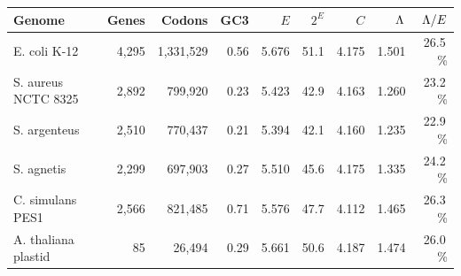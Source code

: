 \begin{tabular}{@{}l r r r r r r r r@{}}
\toprule
Genome & Genes & Codons & GC3 & $E$ & $2^{E}$ & $C$ & $\Lambda$ & $\Lambda/E$ \\
\midrule
E. coli K-12 & 4{,}295 & 1{,}331{,}529 & 0.56 & 5.676 & 51.1 & 4.175 & 1.501 & 26.5\,\% \\
S. aureus NCTC 8325 & 2{,}892 & 799{,}920 & 0.23 & 5.423 & 42.9 & 4.163 & 1.260 & 23.2\,\% \\
S. argenteus & 2{,}510 & 770{,}437 & 0.21 & 5.394 & 42.1 & 4.160 & 1.235 & 22.9\,\% \\
S. agnetis & 2{,}299 & 697{,}903 & 0.27 & 5.510 & 45.6 & 4.175 & 1.335 & 24.2\,\% \\
C. simulans PES1 & 2{,}566 & 821{,}485 & 0.71 & 5.576 & 47.7 & 4.112 & 1.465 & 26.3\,\% \\
A. thaliana plastid & 85 & 26{,}494 & 0.29 & 5.661 & 50.6 & 4.187 & 1.474 & 26.0\,\% \\
\bottomrule
\end{tabular}